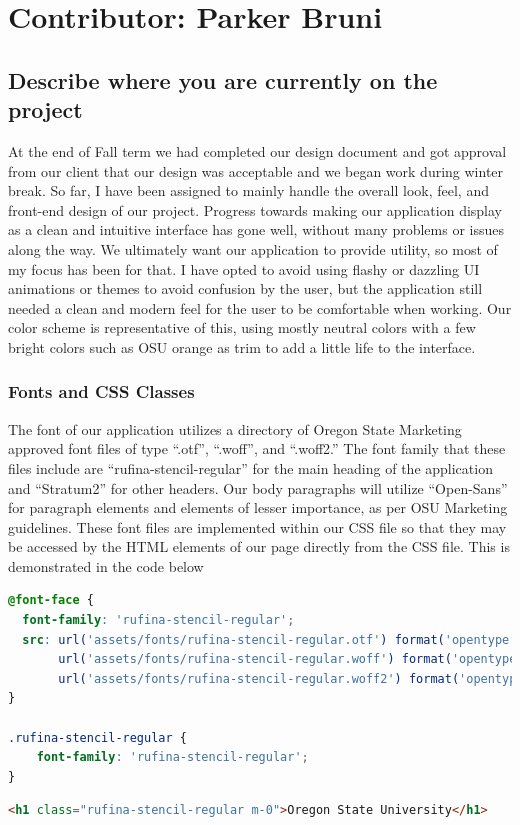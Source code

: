 \documentclass[letterpaper,10pt,serif,draftclsnofoot,onecolumn,compsoc,titlepage]{IEEEtran}
\begin{document}
\section{Contributor: Parker Bruni}
\subsection{Describe where you are currently on the project}
	At the end of Fall term we had completed our design document and got approval from our client that our design was acceptable and we began work during winter break.
	So far, I have been assigned to mainly handle the overall look, feel, and front-end design of our project. Progress towards making our application display as a clean and intuitive 
	interface has gone well, without many problems or issues along the way. We ultimately want our application to provide utility, so most of my focus has been for that. I have
	opted to avoid using flashy or dazzling UI animations or themes to avoid confusion by the user, but the application still needed a clean and modern feel for the user to be 
	comfortable when working. Our color scheme is representative of this, using mostly neutral colors with a few bright colors such as OSU orange as trim to add a little life 
	to the interface. 
	
	\subsubsection{Fonts and CSS Classes}
	The font of our application utilizes a directory of Oregon State Marketing approved font files of type ``.otf'', ``.woff'', and ``.woff2.'' The font family that 
	these files include are ``rufina-stencil-regular'' for the main heading of the application and ``Stratum2'' for other headers. Our body paragraphs will utilize ``Open-Sans''
	for paragraph elements and elements of lesser importance, as per OSU Marketing guidelines. These font files 
	are implemented within our CSS file so that they may be accessed by the HTML elements of our page directly from the CSS file. This is demonstrated in the code below
	
\begin{lstlisting}[caption={CSS Implementation} language=CSS]
@font-face {
  font-family: 'rufina-stencil-regular';
  src: url('assets/fonts/rufina-stencil-regular.otf') format('opentype'),
       url('assets/fonts/rufina-stencil-regular.woff') format('opentype'),
       url('assets/fonts/rufina-stencil-regular.woff2') format('opentype');
}

.rufina-stencil-regular {
	font-family: 'rufina-stencil-regular';
}
\end{lstlisting}
\begin{lstlisting}[caption={HTML Implementation} language=HTML]
<h1 class="rufina-stencil-regular m-0">Oregon State University</h1>
\end{lstlisting}
\end{document}
